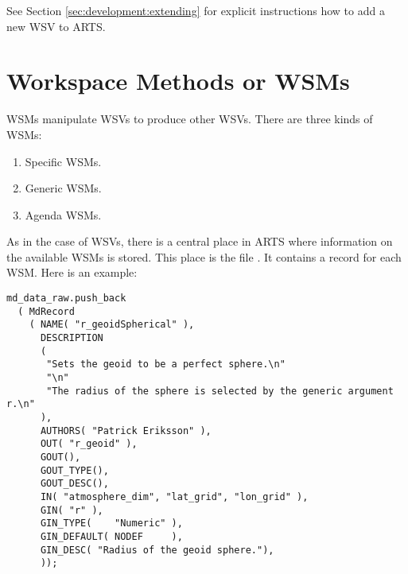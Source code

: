 \noindent
See Section \ref{sec:development:extending} for explicit
instructions how to add a new WSV to ARTS.

\section{Workspace Methods or WSMs}
\label{sec:agendas:wsms}

WSMs manipulate WSVs to produce other WSVs. There are three kinds of
WSMs:
\begin{enumerate}
\item Specific WSMs.
\item Generic WSMs.
\item Agenda WSMs.
\end{enumerate}
As in the case of WSVs, there is a central place in ARTS where
information on the available WSMs is stored. This place is the file
. It contains a record for each WSM. Here is an
example:

\begin{lstlisting}
md_data_raw.push_back
  ( MdRecord
    ( NAME( "r_geoidSpherical" ),
      DESCRIPTION
      (
       "Sets the geoid to be a perfect sphere.\n"
       "\n"
       "The radius of the sphere is selected by the generic argument r.\n"
      ),
      AUTHORS( "Patrick Eriksson" ),
      OUT( "r_geoid" ),
      GOUT(),
      GOUT_TYPE(),
      GOUT_DESC(),
      IN( "atmosphere_dim", "lat_grid", "lon_grid" ),
      GIN( "r" ),
      GIN_TYPE(    "Numeric" ),
      GIN_DEFAULT( NODEF     ),
      GIN_DESC( "Radius of the geoid sphere."),
      ));
\end{lstlisting}

